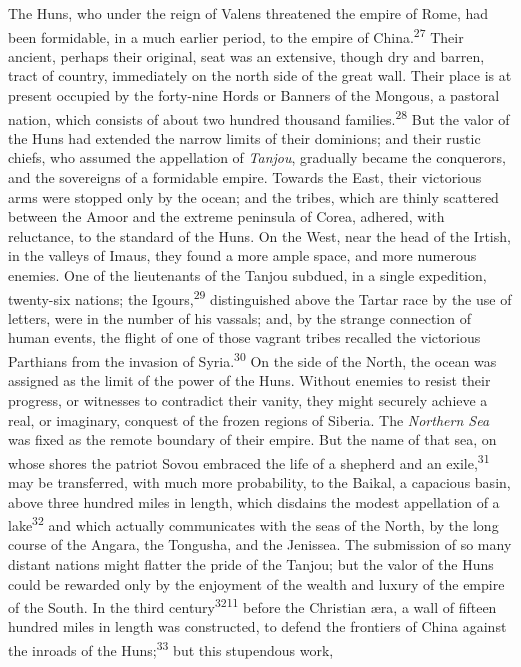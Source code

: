 The Huns, who under the reign of Valens threatened the empire of
Rome, had been formidable, in a much earlier period, to the
empire of China.\textsuperscript{27} Their ancient, perhaps their original, seat
was an extensive, though dry and barren, tract of country,
immediately on the north side of the great wall. Their place is
at present occupied by the forty-nine Hords or Banners of the
Mongous, a pastoral nation, which consists of about two hundred
thousand families.\textsuperscript{28} But the valor of the Huns had extended the
narrow limits of their dominions; and their rustic chiefs, who
assumed the appellation of \textit{Tanjou}, gradually became the
conquerors, and the sovereigns of a formidable empire. Towards
the East, their victorious arms were stopped only by the ocean;
and the tribes, which are thinly scattered between the Amoor and
the extreme peninsula of Corea, adhered, with reluctance, to the
standard of the Huns. On the West, near the head of the Irtish,
in the valleys of Imaus, they found a more ample space, and more
numerous enemies. One of the lieutenants of the Tanjou subdued,
in a single expedition, twenty-six nations; the Igours,\textsuperscript{29}
distinguished above the Tartar race by the use of letters, were
in the number of his vassals; and, by the strange connection of
human events, the flight of one of those vagrant tribes recalled
the victorious Parthians from the invasion of Syria.\textsuperscript{30} On the
side of the North, the ocean was assigned as the limit of the
power of the Huns. Without enemies to resist their progress, or
witnesses to contradict their vanity, they might securely achieve
a real, or imaginary, conquest of the frozen regions of Siberia.
The \textit{Northern Sea} was fixed as the remote boundary of their
empire. But the name of that sea, on whose shores the patriot
Sovou embraced the life of a shepherd and an exile,\textsuperscript{31} may be
transferred, with much more probability, to the Baikal, a
capacious basin, above three hundred miles in length, which
disdains the modest appellation of a lake\textsuperscript{32} and which actually
communicates with the seas of the North, by the long course of
the Angara, the Tongusha, and the Jenissea. The submission of so
many distant nations might flatter the pride of the Tanjou; but
the valor of the Huns could be rewarded only by the enjoyment of
the wealth and luxury of the empire of the South. In the third
century\textsuperscript{3211} before the Christian æra, a wall of fifteen hundred
miles in length was constructed, to defend the frontiers of China
against the inroads of the Huns;\textsuperscript{33} but this stupendous work,
